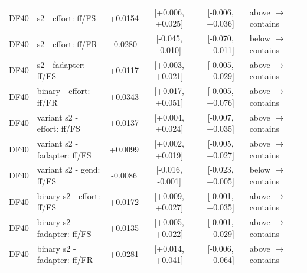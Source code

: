 \begin{tabular}{@{}l l c c c l@{}}
DF40 & \ours{} s2 - effort: ff/FS & +0.0154 & [+0.006, +0.025] & [-0.006, +0.036] & above $\rightarrow$ contains \\
DF40 & \ours{} s2 - effort: ff/FR & -0.0280 & [-0.045, -0.010] & [-0.070, +0.011] & below $\rightarrow$ contains \\
DF40 & \ours{} s2 - fadapter: ff/FS & +0.0117 & [+0.003, +0.021] & [-0.005, +0.029] & above $\rightarrow$ contains \\
DF40 & binary - effort: ff/FR & +0.0343 & [+0.017, +0.051] & [-0.005, +0.076] & above $\rightarrow$ contains \\
DF40 & variant s2 - effort: ff/FS & +0.0137 & [+0.004, +0.024] & [-0.007, +0.035] & above $\rightarrow$ contains \\
DF40 & variant s2 - fadapter: ff/FS & +0.0099 & [+0.002, +0.019] & [-0.005, +0.027] & above $\rightarrow$ contains \\
DF40 & variant s2 - gend: ff/FS & -0.0086 & [-0.016, -0.001] & [-0.023, +0.005] & below $\rightarrow$ contains \\
DF40 & binary s2 - effort: ff/FS & +0.0172 & [+0.009, +0.027] & [-0.001, +0.035] & above $\rightarrow$ contains \\
DF40 & binary s2 - fadapter: ff/FS & +0.0135 & [+0.005, +0.022] & [-0.001, +0.029] & above $\rightarrow$ contains \\
DF40 & binary s2 - fadapter: ff/FR & +0.0281 & [+0.014, +0.041] & [-0.006, +0.064] & above $\rightarrow$ contains \\
\bottomrule
\end{tabular}

